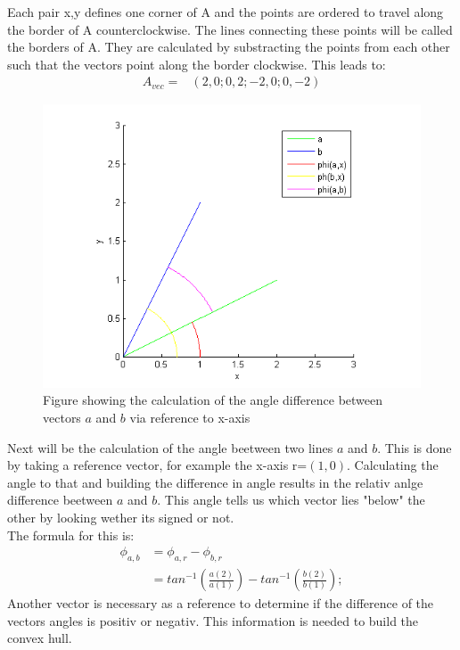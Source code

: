 Each pair x,y defines one corner of A and the points are ordered to travel along the border of A counterclockwise.
The lines connecting these points will be called the borders of A. They are calculated by substracting the points from each other such that the vectors point along the border clockwise. This leads to:
\begin{align*}
A_{vec} = 	&( 2 , 0 ; 0 ,2 ;-2, 0; 0, -2)	
\end{align*}

\begin{figure}[H]
\includegraphics{VectorDegree}
\caption{Figure showing the calculation of the angle difference between vectors $a$ and $b$ via reference to x-axis}
 \end{figure}

Next will be the calculation of the angle beetween two lines $a$ and $b$. This is done by taking a reference vector, for example the x-axis r=$(1,0)$. Calculating the angle to that and building the difference in angle results in the relativ anlge difference beetween $a$ and $b$. This angle tells us which vector lies "below" the other by looking wether its signed or not.\\
The formula for this is:
\begin{align*}
  \phi_{a,b} &= \phi_{a,r} - \phi_{b,r}\\
	&= tan^{-1} ( \frac{ a(2) }{  a(1) } ) - tan^{-1} ( \frac{b(2)}{b(1)}); 
\end{align*}
Another vector is necessary as a reference to determine if the difference of the vectors angles is positiv or negativ. This information is needed to build the convex hull.


